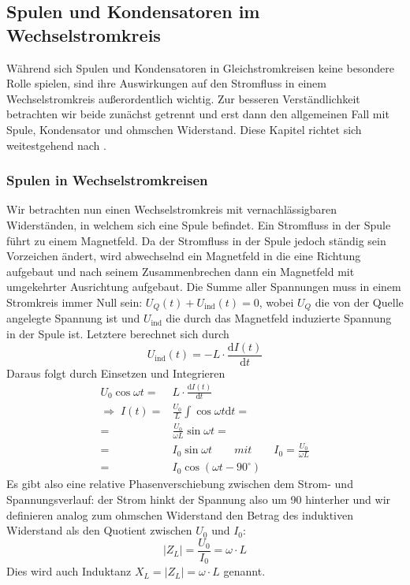 
\subsection{Spulen und Kondensatoren im Wechselstromkreis}
Während sich Spulen und Kondensatoren in Gleichstromkreisen keine besondere Rolle spielen, sind ihre Auswirkungen auf den Stromfluss in einem Wechselstromkreis außerordentlich wichtig. Zur besseren Verständlichkeit betrachten wir beide zunächst getrennt und erst dann den allgemeinen Fall mit Spule, Kondensator und ohmschen Widerstand. Diese Kapitel richtet sich weitestgehend nach \cite{Demtroeder}.

\subsubsection{Spulen in Wechselstromkreisen}
Wir betrachten nun einen Wechselstromkreis mit vernachlässigbaren Widerständen, in welchem sich eine Spule befindet. Ein Stromfluss in der Spule führt zu einem Magnetfeld. Da der Stromfluss in der Spule jedoch ständig sein Vorzeichen ändert, wird abwechselnd ein Magnetfeld in die eine Richtung aufgebaut und nach seinem Zusammenbrechen dann ein Magnetfeld mit umgekehrter Ausrichtung aufgebaut.
Die Summe aller Spannungen muss in einem Stromkreis immer Null sein:
$ U_Q(t) + U_\mathrm{ind}(t) = 0 $,
wobei $U_Q$ die von der Quelle angelegte Spannung ist und $U_\mathrm{ind}$ die durch das Magnetfeld induzierte Spannung in der Spule ist. Letztere berechnet sich durch
\begin{equation}
U_\mathrm{ind}(t) = - L \cdot \frac{\mathrm dI(t)}{\mathrm dt}
\end{equation}
Daraus folgt durch Einsetzen und Integrieren
\begin{align}
U_0 \cos \omega t =& L \cdot \frac{\mathrm dI(t)}{\mathrm dt} \nonumber \\ 
\Rightarrow\; I(t) =& \frac{U_0}{L} \int \cos \omega t \mathrm dt = \nonumber \\ 
=& \frac{U_0}{\omega L} \sin \omega t = \nonumber\\
=& I_0 \sin \omega t \qquad mit\qquad I_0 = \frac{U_0}{\omega L}  \nonumber\\
=& I_0 \cos(\omega t - 90^\circ)
\end{align}
Es gibt also eine relative Phasenverschiebung zwischen dem Strom- und Spannungsverlauf: der Strom hinkt der Spannung also um \unit{90}{\degree} hinterher und wir definieren analog zum ohmschen Widerstand den Betrag des induktiven Widerstand als den Quotient zwischen $U_0$ und $I_0$:
\begin{equation}
\left|Z_L\right| = \frac{U_0}{I_0} = \omega \cdot L
\end{equation}
Dies wird auch Induktanz $X_L = \left|Z_L\right| = \omega \cdot L$ genannt.

